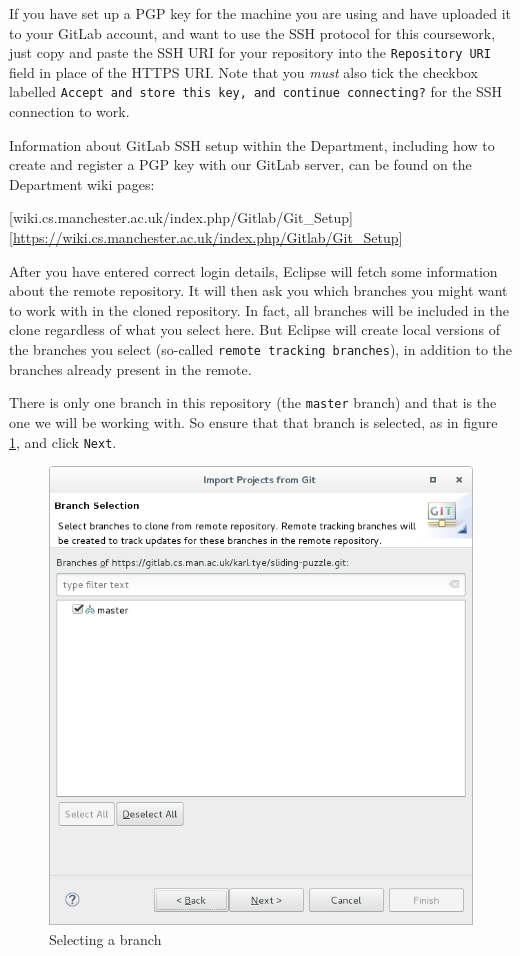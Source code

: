 \documentclass[
]{book}
\begin{document}
If you have set up a PGP key for the machine you are using and have uploaded it to your GitLab account, and want to use the SSH protocol for this coursework, just copy and paste the SSH URI for your repository into the \texttt{Repository\ URI} field in place of the HTTPS URI. Note that you \emph{must} also tick the checkbox labelled \texttt{Accept\ and\ store\ this\ key,\ and\ continue\ connecting?} for the SSH connection to work.

Information about GitLab SSH setup within the Department, including how to create and register a PGP key with our GitLab server, can be found on the Department wiki pages:

{[}wiki.cs.manchester.ac.uk/index.php/Gitlab/Git\_Setup{]}{[}\url{https://wiki.cs.manchester.ac.uk/index.php/Gitlab/Git_Setup}{]}

After you have entered correct login details, Eclipse will fetch some information about the remote repository. It will then ask you which branches you might want to work with in the cloned repository. In fact, all branches will be included in the clone regardless of what you select here. But Eclipse will create local versions of the branches you select (so-called \texttt{remote\ tracking\ branches}), in addition to the branches already present in the remote.

There is only one branch in this repository (the \texttt{master} branch) and that is the one we will be working with. So ensure that that branch is selected, as in figure \ref{fig:selectLocalBranchesForClone-fig}, and click \texttt{Next}.

\begin{figure}

{\centering \includegraphics[width=0.8\linewidth]{images/selectLocalBranchesForClone} 

}

\caption{Selecting a branch}\label{fig:selectLocalBranchesForClone-fig}
\end{figure}
\end{document}

